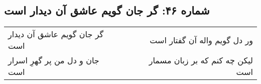 \begin{center}
\section*{شماره ۴۶: گر جان گویم عاشق آن دیدار است}
\label{sec:046}
\begin{longtable}{l p{0.5cm} r}
گر جان گویم عاشق آن دیدار است
&&
ور دل گویم واله آن گفتار است
\\
جان و دل من پر گهرِ اسرار است
&&
لیکن چه کنم که بر زبان مسمار است
\\
\end{longtable}
\end{center}
